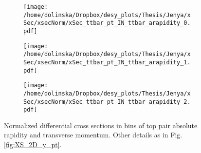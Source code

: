 \begin{figure}[H]
\centering
\begin{subfigure}
  \centering
  \texttt{[image: /home/dolinska/Dropbox/desy\_plots/Thesis/Jenya/xSec/xsecNorm/xSec\_ttbar\_pt\_IN\_ttbar\_arapidity\_0.pdf]}
\end{subfigure}
\begin{subfigure}
  \centering
  \texttt{[image: /home/dolinska/Dropbox/desy\_plots/Thesis/Jenya/xSec/xsecNorm/xSec\_ttbar\_pt\_IN\_ttbar\_arapidity\_1.pdf]}
\end{subfigure}
\begin{subfigure}
  \centering
  \texttt{[image: /home/dolinska/Dropbox/desy\_plots/Thesis/Jenya/xSec/xsecNorm/xSec\_ttbar\_pt\_IN\_ttbar\_arapidity\_2.pdf]}
\end{subfigure}
\caption{Normalized differential cross sections in bins of top pair absolute rapidity and transverse momentum. Other details as in Fig. \ref{fig:XS_2D_y_pt}.}
\label{fig:XS_2D_pttt_ytt}
\end{figure}

